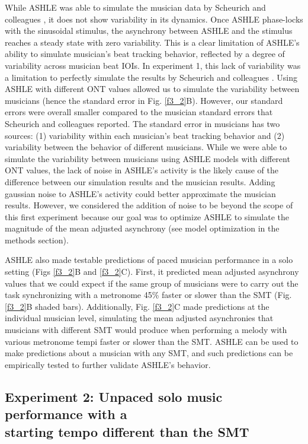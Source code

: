 \documentclass{report}
\begin{document}
While ASHLE was able to simulate the musician data by Scheurich and colleagues \cite{scheurich2018tapping}, it does not show variability in its dynamics. Once ASHLE phase-locks with the sinusoidal stimulus, the asynchrony between ASHLE and the stimulus reaches a steady state with zero variability. This is a clear limitation of ASHLE's ability to simulate musician's beat tracking behavior, reflected by a degree of variability across musician beat IOIs. In experiment 1, this lack of variability was a limitation to perfectly simulate the results by Scheurich and colleagues \cite{scheurich2018tapping}. Using ASHLE with different ONT values allowed us to simulate the variability between musicians (hence the standard error in Fig.{} \ref{f3_2}B). However, our standard errors were overall smaller compared to the musician standard errors that Scheurich and colleagues \cite{scheurich2018tapping} reported. The standard error in musicians has two sources: (1) variability within each musician's beat tracking behavior and (2) variability between the behavior of different musicians. While we were able to simulate the variability between musicians using ASHLE models with different ONT values, the lack of noise in ASHLE's activity is the likely cause of the difference between our simulation results and the musician results. Adding gaussian noise to ASHLE's activity could better approximate the musician results. However, we considered the addition of noise to be beyond the scope of this first experiment because our goal was to optimize ASHLE to simulate the magnitude of the mean adjusted asynchrony (see model optimization in the methods section).

ASHLE also made testable predictions of paced musician performance in a solo setting (Figs \ref{f3_2}B and \ref{f3_2}C). First, it predicted mean adjusted asynchrony values that we could expect if the same group of musicians were to carry out the task synchronizing with a metronome 45\% faster or slower than the SMT (Fig.{} \ref{f3_2}B shaded bars). Additionally, Fig.{} \ref{f3_2}C made predictions at the individual musician level, simulating the mean adjusted asynchronies that musicians with different SMT would produce when performing a melody with various metronome tempi faster or slower than the SMT. ASHLE can be used to make predictions about a musician with any SMT, and such predictions can be empirically tested to further validate ASHLE's behavior.

\subsection{Experiment 2: Unpaced solo music performance with a \\ starting tempo different than the SMT}
\end{document}
